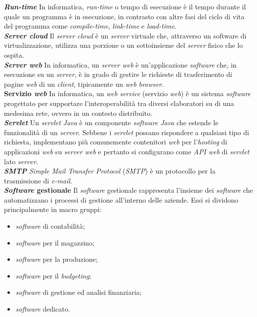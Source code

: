 \textbf{\textit{Run-time}} In informatica, \textit{run-time} o tempo di esecuzione è il tempo durante il quale un programma è in esecuzione, in contrasto con altre fasi del ciclo di vita del programma come \textit{compile-time}, \textit{link-time} e \textit{load-time}.\\

\textbf{\textit{Server cloud}} Il \textit{server cloud} è un \textit{server} virtuale che, attraverso un software di virtualizzazione, utilizza una porzione o un sottoinsieme del \textit{server} fisico che lo ospita.\\

\textbf{\textit{Server web}} In informatica, un \textit{server web} è un'applicazione \textit{software} che, in esecuzione su un \textit{server}, è in grado di gestire le richieste di trasferimento di pagine \textit{web} di un \textit{client}, tipicamente un \textit{web browser}.\\

\textbf{Servizio \textit{web}} In informatica, un \textit{web service} (servizio \textit{web}) è un sistema \textit{software} progettato per supportare l'interoperabilità tra diversi elaboratori su di una medesima rete, ovvero in un contesto distribuito.\\

\textbf{\textit{Servlet}} Un \textit{servlet Java} è un componente \textit{software Java} che estende le funzionalità di un \textit{server}. Sebbene i \textit{servlet} possano rispondere a qualsiasi tipo di richiesta, implementano più comunemente contenitori \textit{web} per l'\textit{hosting} di applicazioni \textit{web} su \textit{server web} e pertanto si configurano come \textit{API web} di \textit{servlet} lato \textit{server}.\\

\textbf{\textit{SMTP}} \textit{Simple Mail Transfer Protocol} (\textit{SMTP}) è un protocollo per la trasmissione di \textit{e-mail}.\\

\textbf{\textit{Software} gestionale} Il \textit{software} gestionale rappresenta l'insieme dei \textit{software} che automatizzano i processi di gestione all'interno delle aziende. Essi si dividono principalmente in macro gruppi:
\begin{itemize}
	\item \textit{software} di contabilità;
	\item \textit{software} per il magazzino;
	\item \textit{software} per la produzione;
	\item \textit{software} per il \textit{budgeting};
	\item \textit{software} di gestione ed analisi finanziaria;
	\item \textit{software} dedicato.
\end{itemize}

